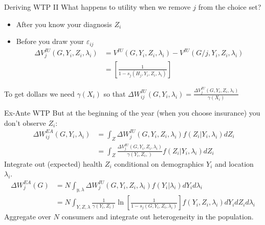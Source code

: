 \documentclass[aspectratio=169,10pt]{beamer}
\begin{document}
\begin{frame}{Deriving WTP II}
What happens to utility when we remove $j$ from the choice set?
\begin{itemize}
\item \alert{After} you know your diagnosis $Z_i$
\item \alert{Before} you draw your $\varepsilon_{ij}$
\begin{align*}\Delta V_{j}^{I U}\left(G, Y_{i}, Z_{i}, \lambda_{i}\right)  &=V^{I U}\left(G, Y_{i}, Z_{i}, \lambda_{i}\right)-V^{I U}\left(G / j, Y_{i}, Z_{i}, \lambda_{i}\right) \\
&=\left[\frac{1}{1-s_{j}\left(H_{j}, Y_{i}, Z_{i}, \lambda_{i}\right)}\right]
\end{align*}
\end{itemize}
To get dollars we need $\gamma(X_i)$ so that $\Delta W_{ij}^{IU}(G,Y_i,\lambda_i) = \frac{\Delta V_{j}^{I U}\left(G, Y_{i}, Z_{i}, \lambda_{i}\right) }{\gamma(X_i)}$
\end{frame}

\begin{frame}{Ex-Ante WTP}
But at the beginning of the year (when you choose insurance) you don't observe $Z_i$:
\begin{align*}
\ \Delta W_{i j}^{E A}\left(G, Y_{i}, \lambda_{i}\right) &=\int_{Z} \Delta W_{j}^{I U}\left(G, Y_{i}, Z_{i}, \lambda_{i}\right) f\left(Z_{i} | Y_{i}, \lambda_{i}\right) d Z_{i} \\
 &=\int_{Z} \frac{\Delta V_{j}^{I U}\left(G, Y_{i}, Z_{i}, \lambda_{i}\right)}{\gamma\left(Y_{i}, Z_{i},\right)} f\left(Z_{i} | Y_{i}, \lambda_{i}\right) d Z_{i} 
 \end{align*}
 Integrate out (expected) health $Z_i$ conditional on demographics $Y_i$ and location $\lambda_i$.
\begin{align*}
 \Delta W_{j}^{E A}(G) &=N \int_{y, \lambda} \Delta W_{j}^{I U}\left(G, Y_{i}, Z_{i}, \lambda_{i}\right) f\left(Y_{i} | \lambda_{i}\right) d Y_{i} d \lambda_{i} \\ &=N \int_{Y, Z, \lambda} \frac{1}{\gamma\left(Y_{i}, Z_{i}\right)} \ln \left[\frac{1}{1-s_{j}\left(G, Y_{i}, Z_{i}, \lambda_{i}\right)}\right] f\left(Y_{i}, Z_{i}, \lambda_{i}\right) d Y_{i} d Z_{i} d \lambda_{i}
\end{align*}
Aggregate over $N$ consumers and integrate out heterogeneity in the population.
\end{frame}
\end{document}
